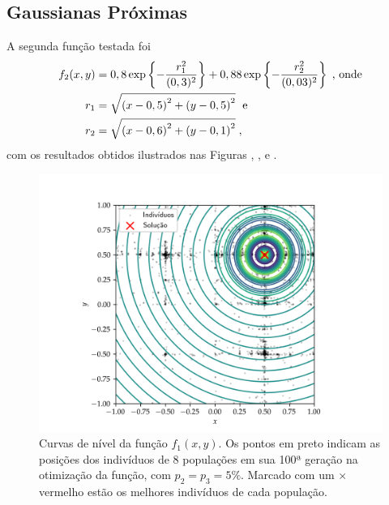 \subsection{Gaussianas Próximas}

A segunda função testada foi
\begin{align}
  \begin{split}
    f_2(x,y) & = 0,8 \exp\left\{-\frac{r_1^2}{(0,3)^2}\right\} +
    0,88 \exp\left\{-\frac{r_2^2}{(0,03)^2}\right\} \;\text{, onde} \\
    r_1      & = \sqrt{
      \left(x - 0,5\right)^2 +
      \left(y - 0,5\right)^2
    } \;\text{ e} \\
    r_2      & = \sqrt{
      \left(x - 0,6\right)^2 +
      \left(y - 0,1\right)^2
    } \;\mathrm{,}
  \end{split}
  \label{eq:func_near_gaussians}
\end{align}
com os resultados obtidos ilustrados nas Figuras ,
,  e 
.

\begin{figure}[p]
  \centering
  \includegraphics[width=\textwidth]{imagens/low_prob/contour_damped_cossine.png}
  \caption{
    Curvas de nível da função $f_1(x,y)$. Os pontos em preto indicam as posições dos indivíduos
    de 8 populações em sua 100ª geração na otimização da função, com $ p_2 = p_3 = 5\% $. 
    Marcado com um $\times$ vermelho estão os melhores indivíduos de cada população.
  }
  \label{fig:contour_damped_cossine}
\end{figure}

